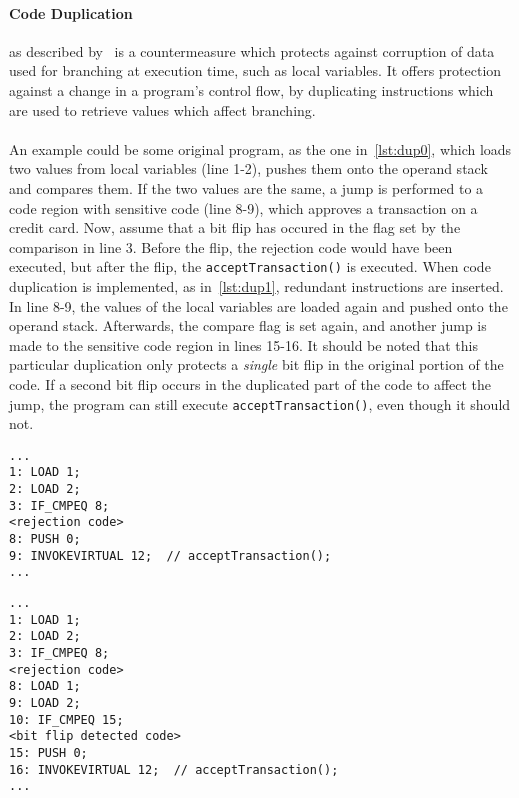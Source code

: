 \paragraph{Code Duplication}as described by~\cite[p. 12]{javasec} is a countermeasure which protects against corruption of data used for branching at execution time, such as local variables. It offers protection against a change in a program's control flow, by duplicating instructions which are used to retrieve values which affect branching.\\\\
An example could be some original program, as the one in~\cref{lst:dup0}, which loads two values from local variables (line 1-2), pushes them onto the operand stack and compares them. If the two values are the same, a jump is performed to a code region with sensitive code (line 8-9), which approves a transaction on a credit card. Now, assume that a bit flip has occured in the flag set by the comparison in line 3. Before the flip, the rejection code would have been executed, but after the flip, the \texttt{acceptTransaction()} is executed. When code duplication is implemented, as in~\cref{lst:dup1}, redundant instructions are inserted. In line 8-9, the values of the local variables are loaded again and pushed onto the operand stack. Afterwards, the compare flag is set again, and another jump is made to the sensitive code region in lines 15-16. It should be noted that this particular duplication only protects a \textit{single} bit flip in the original portion of the code. If a second bit flip occurs in the duplicated part of the code to affect the jump, the program can still execute \texttt{acceptTransaction()}, even though it should not.

\begin{minipage}{\linewidth}
\begin{lstlisting}[caption={Original program without code duplication implemented. The code is written in \jcl. Note that for simplicity, the numbers in the left side are line numbers and do not denote the program counter values.}, label={lst:dup0}]
...
1: LOAD 1;
2: LOAD 2;
3: IF_CMPEQ 8;
<rejection code>
8: PUSH 0;
9: INVOKEVIRTUAL 12;  // acceptTransaction();
...
\end{lstlisting}
\end{minipage}

\begin{minipage}{\linewidth}
\begin{lstlisting}[caption={Modified program with code duplication implemented. The code is written in \jcl. Note that for simplicity, the numbers in the left side are line numbers and do not denote the program counter values.}, label={lst:dup1}]
...
1: LOAD 1;
2: LOAD 2;
3: IF_CMPEQ 8;
<rejection code>
8: LOAD 1;
9: LOAD 2;
10: IF_CMPEQ 15;
<bit flip detected code>
15: PUSH 0;
16: INVOKEVIRTUAL 12;  // acceptTransaction();
...
\end{lstlisting}
\end{minipage}
